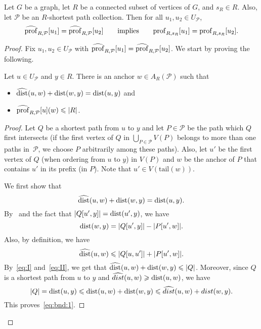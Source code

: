 \begin{lemma}\label{lem:hat-to-normal}
  Let $G$ be a graph, let $R$ be a connected subset of vertices of $G$, and $s_R\in R$. Also, let $\mathcal{P}$ be an $R$-shortest path collection.
  Then for all $u_1,u_2\in U_{\mathcal{P}}$,
  $$\widehat{\mathrm{prof}}_{R,\mathcal{P}}[u_1]=\widehat{\mathrm{prof}}_{R,\mathcal{P}}[u_2]\qquad\textrm{implies}\qquad \mathrm{prof}_{R,s_R}[u_1]=\mathrm{prof}_{R,s_R}[u_2].$$
\end{lemma}
\begin{proof}
  Fix $u_1,u_2\in U_{\mathcal{P}}$ with
  $\widehat{\mathrm{prof}}_{R,\mathcal{P}}[u_1]=\widehat{\mathrm{prof}}_{R,\mathcal{P}}[u_2]$.
  We start by proving the following.

  \begin{claim}\label{cl:bnd}
    Let $u\in U_{\mathcal{P}}$ and $y\in R$. There is an anchor $w \in A_R(\mathcal{P})$
    such that
    \begin{itemize}[nosep]
      \item $\widehat{\mathrm{dist}}(u,w)+\mathrm{dist}(w,y) = \mathrm{dist}(u,y)$ and
      \item $\widehat{\mathrm{prof}}_{R,\mathcal{P}}[u](w)\leqslant |R|$.
    \end{itemize}
  \end{claim}
  \begin{proof}
    Let $Q$ be a shortest path from $u$ to $y$ and let $P\in\mathcal{P}$ be the path which $Q$ first intersects
    (if the first vertex of $Q$ in $\bigcup_{P \in \mathcal{P}} V(P)$ belongs to more than one paths in~$\mathcal{P}$,
    we choose $P$ arbitrarily among these paths). 
    Also, let $u'$ be the first vertex of $Q$ (when ordering from $u$ to $y$) in $V(P)$
    and $w$ be the anchor of $P$ that contains $u'$ in its prefix (in $P$).
    Note that $u' \in V(\mathrm{tail}(w))$.

    We first show that 
    \begin{equation}\label{eq:bnd:1}\widehat{\mathrm{dist}}(u,w)+\mathrm{dist}(w,y)= \mathrm{dist}(u,y).\end{equation}
    By~ and the fact that $|Q[u',y]| = \mathrm{dist}(u',y)$, we have
    \begin{equation}\label{eq:I}
      \mathrm{dist}(w,y) = |Q[u',y]|-|P[u',w]|.
    \end{equation}
    Also, by definition, we have
    \begin{equation}\label{eq:II}
      \widehat{\mathrm{dist}}(u,w)\leqslant |Q[u,u']|+|P[u',w]|.
    \end{equation}
    By~\eqref{eq:I} and~\eqref{eq:II}, we get that $\widehat{\mathrm{dist}}(u,w)+\mathrm{dist}(w,y)\leqslant |Q|$.
    Moreover, since $Q$ is a shortest path from $u$ to $y$ and $\widehat{dist}(u,w) \geqslant \mathrm{dist}(u,w)$,
    we have
    \[ |Q| = \mathrm{dist}(u,y) \leqslant \mathrm{dist}(u,w) + \mathrm{dist}(w,y) \leqslant \widehat{dist}(u,w) + dist(w,y).\]
    This proves~\eqref{eq:bnd:1}.
 

\end{proof}
\end{proof}
